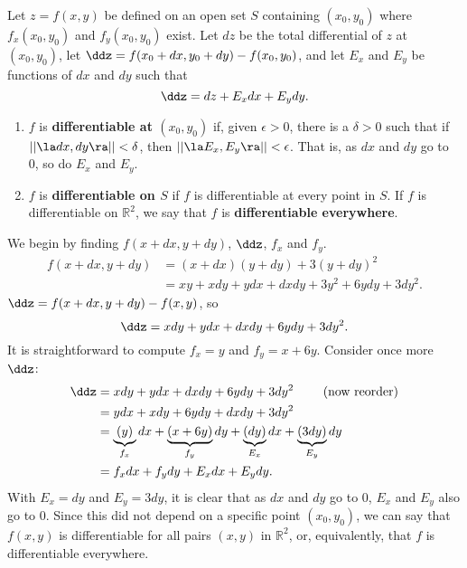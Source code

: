 {Let $z=f(x,y)$ be defined on an open set $S$ containing $(x_0,y_0)$ where $f_x(x_0,y_0)$ and $f_y(x_0,y_0)$ exist. Let $dz$ be the total differential of $z$ at $(x_0,y_0)$, let $\ddz = f(x_0+dx,y_0+dy) - f(x_0,y_0)$, and let $E_x$ and $E_y$ be functions of $dx$ and $dy$  such that 
$$\ddz = dz + E_xdx + E_ydy.$$
\begin{enumerate}
	\item $f$ is \textbf{differentiable at $(x_0,y_0)$} if, given $\epsilon >0$, there is a $\delta >0$ such that if $||\la dx,dy\ra|| < \delta$, then $||\la E_x,E_y\ra|| < \epsilon$. That is, as $dx$ and $dy$ go to 0, so do $E_x$ and $E_y$.
	\item	$f$ is \textbf{differentiable on $S$} if $f$ is differentiable at every point in $S$. If $f$ is differentiable on $\mathbb{R}^2$, we say that $f$ is \textbf{differentiable everywhere}.
\end{enumerate}
}

{We begin by finding $f(x+dx,y+dy)$, $\ddz$, $f_x$ and $f_y$.
\begin{align*}
f(x+dx,y+dy) &= (x+dx)(y+dy) + 3(y+dy)^2 \\
						&= xy + xdy+ydx+dxdy + 3y^2+6ydy+3dy^2.
\end{align*}
$\ddz = f(x+dx,y+dy) - f(x,y)$, so
$$\ddz = xdy + ydx + dxdy + 6ydy+3dy^2.$$
It is straightforward to compute $f_x = y$ and $f_y = x+6y$. Consider once more $\ddz$:
\begin{align*}
\ddz &= xdy + ydx + dxdy + 6ydy+3dy^2 \qquad \text{ (now reorder)}\\
		&= ydx + xdy+6ydy+ dxdy + 3dy^2\\
		&= \underbrace{(y)}_{f_x}dx + \underbrace{(x+6y)}_{f_y}dy + \underbrace{(dy)}_{E_x}dx+\underbrace{(3dy)}_{E_y}dy\\
		&= f_xdx + f_ydy + E_xdx+E_ydy.
\end{align*}
With $E_x = dy$ and $E_y = 3dy$, it is clear that as $dx$ and $ dy$ go to 0, $E_x$ and $E_y$ also go to 0. Since this did not depend on a specific point $(x_0,y_0)$, we can say that $f(x,y)$ is differentiable for all pairs $(x,y)$ in $\mathbb{R}^2$, or, equivalently, that $f$ is differentiable everywhere. 
}\\

